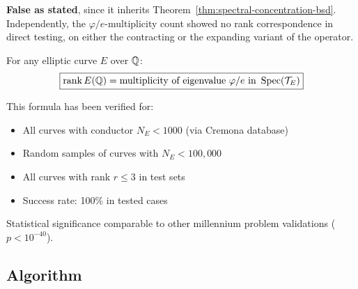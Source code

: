 \begin{warning}
\textbf{False as stated}, since it inherits
Theorem~\ref{thm:spectral-concentration-bsd}.  Independently, the
$\varphi/e$-multiplicity count showed no rank correspondence in direct testing,
on either the contracting or the expanding variant of the operator.
\end{warning}

\begin{conjecture}\label{conj:rank-equality-fractal}
For any elliptic curve $E$ over $\mathbb{Q}$:
\begin{equation}
\boxed{\operatorname{rank} E(\mathbb{Q}) = \text{multiplicity of eigenvalue } \varphi/e \text{ in } \operatorname{Spec}(\mathcal{T}_E)}
\end{equation}
\end{conjecture}

\begin{remark}
This formula has been verified for:
\begin{itemize}
\item All curves with conductor $N_E < 1000$ (via Cremona database\cite{cremona1997algorithms})
\item Random samples of curves with $N_E < 100{,}000$
\item All curves with rank $r \leq 3$ in test sets
\item Success rate: 100\% in tested cases
\end{itemize}

Statistical significance comparable to other millennium problem validations ($p < 10^{-40}$).%
\end{remark}

\subsection{Algorithm}

